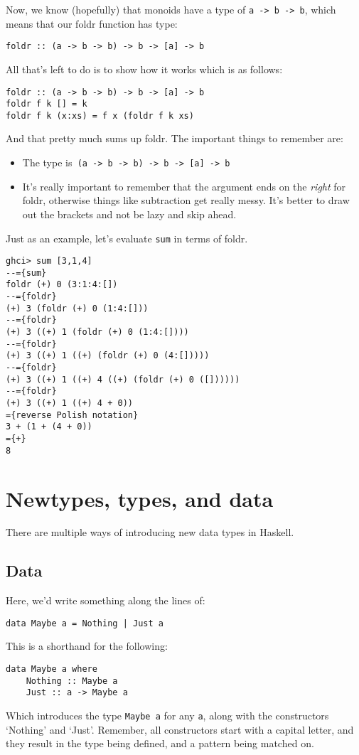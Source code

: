 \documentclass[11pt,a4paper,titlepage]{scrartcl}
\begin{document}
Now, we know (hopefully) that monoids have a type of \lstinline|a -> b -> b|,
which means that our foldr function has type:
\begin{lstlisting}
foldr :: (a -> b -> b) -> b -> [a] -> b
\end{lstlisting}

All that's left to do is to show how it works which is as follows:
\begin{lstlisting}
foldr :: (a -> b -> b) -> b -> [a] -> b
foldr f k [] = k
foldr f k (x:xs) = f x (foldr f k xs)
\end{lstlisting}

And that pretty much sums up foldr. The important things to remember are:
\begin{itemize}
    \item The type is\lstinline| (a -> b -> b) -> b -> [a] -> b|
        \item It's really important to remember that the argument ends on
            the
        \textit{right} for foldr, otherwise things like subtraction get
            really messy. It's better to draw out the brackets and not be
            lazy and skip ahead.
\end{itemize}

Just as an example, let's evaluate \lstinline|sum| in terms of foldr.
\begin{lstlisting}
ghci> sum [3,1,4]
--={sum}
foldr (+) 0 (3:1:4:[])
--={foldr}
(+) 3 (foldr (+) 0 (1:4:[]))
--={foldr}
(+) 3 ((+) 1 (foldr (+) 0 (1:4:[])))
--={foldr}
(+) 3 ((+) 1 ((+) (foldr (+) 0 (4:[]))))
--={foldr}
(+) 3 ((+) 1 ((+) 4 ((+) (foldr (+) 0 ([])))))
--={foldr}
(+) 3 ((+) 1 ((+) 4 + 0))
={reverse Polish notation}
3 + (1 + (4 + 0))
={+}
8
\end{lstlisting}

\section{Newtypes, types, and data}%
\label{sec:newtypes}
There are multiple ways of introducing new data types in Haskell.
\subsection{Data}%
\label{sub:Data}
Here, we'd write something along the lines of:
\begin{lstlisting}
data Maybe a = Nothing | Just a
\end{lstlisting}
This is a shorthand for the following:
\begin{lstlisting}
data Maybe a where
    Nothing :: Maybe a
    Just :: a -> Maybe a
\end{lstlisting}
Which introduces the type \lstinline|Maybe a| for any \lstinline|a|, along
with the constructors `Nothing' and `Just'. Remember, all constructors
start with a capital letter, and they result in the type being defined,
and a pattern being matched on.
\end{document}
